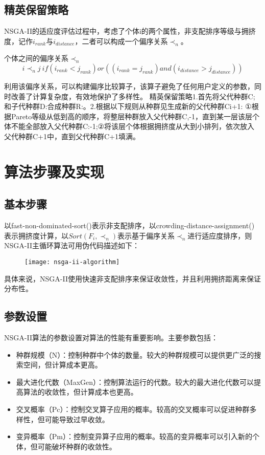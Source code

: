 \documentclass[lang=cn,a4paper,citestyle=gb7714-2015, bibstyle=gb7714-2015]{elegantpaper}
\begin{document}
    \subsection{精英保留策略}
    NSGA-II的适应度评估过程中，考虑了个体i的两个属性，非支配排序等级与拥挤度，记作$i_{rank}$与$i_{distance}$，二者可以构成一个偏序关系$\prec_n$。

    \begin{definition}
        个体之间的偏序关系$\prec_n$\\
        $$i\prec_nj\ if(i_{rank}<j_{rank}) or ((i_{rank}=j_{rank}) and (i_{distance} > j_{distance}))$$
    \end{definition}
    利用该偏序关系，可以构建偏序比较算子，该算子避免了任何用户定义的参数，同时改善了计算复杂度，有效地保护了多样性。
    精英保留策略1.首先将父代种群C;和子代种群D:合成种群R:。2.根据以下规则从种群见生成新的父代种群Ci+1:
    ①根据Pareto等级从低到高的顺序，将整层种群放入父代种群C,-1，直到某一层该层个体不能全部放入父代种群C:-1;②将该层个体根据拥挤度从大到小排列，依次放入父代种群C+1中，直到父代种群C+1填满。

    \section{算法步骤及实现}

    \subsection{基本步骤}
    以fast-non-dominated-sort()表示非支配排序，以crowding-distance-assignment()表示拥挤度计算，以$Sort(F_i,\prec_n)$表示基于偏序关系$\prec_n$进行适应度排序，则NSGA-II主循环算法可用伪代码描述如下：\\
    \begin{figure}[!h]
        \centering
        \texttt{[image: nsga-ii-algorithm]}
    \end{figure}

    具体来说，NSGA-II使用快速非支配排序来保证收敛性，并且利用拥挤距离来保证分布性。

    \subsection{参数设置}
    NSGA-II算法的参数设置对算法的性能有重要影响。主要参数包括：
    \begin{itemize}
        \item 种群规模（N）：控制种群中个体的数量。较大的种群规模可以提供更广泛的搜索空间，但计算成本更高。
        \item 最大进化代数（MaxGen）：控制算法运行的代数。较大的最大进化代数可以提高算法的收敛性，但计算成本也更高。
        \item 交叉概率（Pc）：控制交叉算子应用的概率。较高的交叉概率可以促进种群多样性，但可能导致过早收敛。
        \item 变异概率（Pm）：控制变异算子应用的概率。较高的变异概率可以引入新的个体，但可能破坏种群的收敛性。
    \end{itemize}
\end{document}
